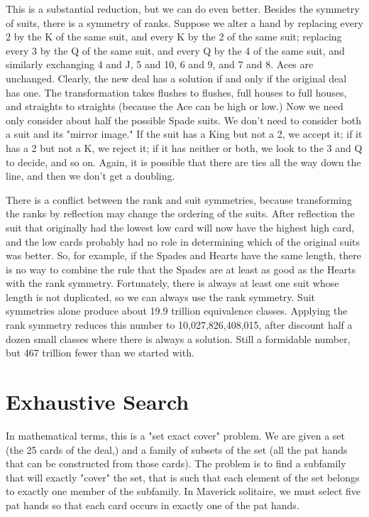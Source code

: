 \documentclass [12pt, letterpaper] {article}
\begin{document}
This is a substantial reduction, but we can do even better.  Besides the symmetry of suits, there is a symmetry of ranks.
Suppose we alter a hand by replacing every 2 by the K of the same suit, and every K by the 2 of the same suit; replacing
every 3 by the Q of the same suit, and every Q by the 4 of the same suit, and similarly exchanging 4 and J, 5 and 10, 6 and 9, and 7 and 8.
Aces are unchanged.  Clearly, the new deal has a solution if and only if the original deal has one.  The transformation takes flushes to 
flushes, full houses to full houses, and straights to straights (because the Ace can be high or low.)  
Now we need only consider about half the possible Spade suits.  We don't need to consider both a
suit and its "mirror image."  If the suit has a King but not a 2, we accept it; if it has a 2 but not a K, we reject it; if it has neither or both, 
we look to the 3 and Q to decide, and so on.  Again, it is possible that there are ties all the way down the line, and then we 
don't get a doubling.

There is a conflict between the rank and suit symmetries, because transforming the ranks by reflection may change the ordering of the suits.  After reflection
the suit that originally had the lowest low card will now have the highest high card, and the low cards probably had no role in determining
which of the original suits was better.  So, for example, if the Spades and Hearts have the same length, there is no way to combine the rule 
that the Spades are at least as good as the Hearts with the rank symmetry.  Fortunately, there is always at least one suit whose length is not
duplicated, so we can always use the rank symmetry.   Suit symmetries alone produce about 19.9 trillion equivalence 
classes.  Applying the rank symmetry reduces this number to 10,027,826,408,015, after discount half a dozen small classes where 
there is always a solution.  Still a formidable number, but 467 trillion fewer than we started with.

\section*{Exhaustive Search}

In mathematical terms, this is a "set exact cover" problem.  We are given a set (the 25 cards of the deal,) 
and a family of subsets of the set (all the pat hands that can be constructed from those cards).  The problem is 
to find a subfamily that will exactly "cover" the set, that is such that each element of the set belongs to exactly 
one member of the subfamily.  In Maverick solitaire, we must select five pat hands so that each card occurs 
in exactly one of the pat hands.
\end{document}
